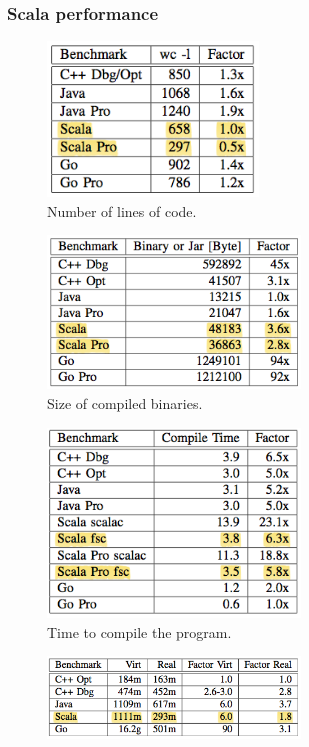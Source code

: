 \documentclass{beamer}
\begin{document}
\begin{frame}
	\frametitle{Scala performance}
	 {
		\begin{figure}[htb]
 			\centering
			\includegraphics[width=0.5\textwidth]{01_code_lines.png}
			\caption{Number of lines of code.}
		\end{figure}	
	}	
	 {
		\begin{figure}[htb]
 			\centering
			\includegraphics[width=0.6\textwidth]{02_binaries_size.png}
			\caption{Size of compiled binaries.}
		\end{figure}	
	}	
	 {
		\begin{figure}[htb]
 			\centering
			\includegraphics[width=0.6\textwidth]{03_compile_time.png}
			\caption{Time to compile the program.}
		\end{figure}	
	}	
	 {
		\begin{figure}[htb]
 			\centering
			\includegraphics[width=0.6\textwidth]{04_memory_footprint.png}

\end{figure}}
\end{frame}
\end{document}
